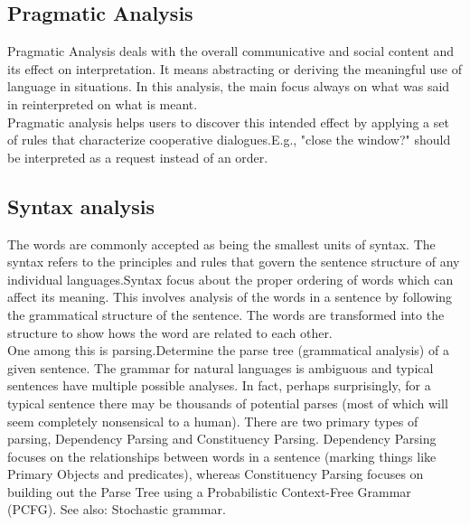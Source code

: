 \subsection{Pragmatic Analysis}
Pragmatic Analysis deals with the overall communicative and social content and its effect on interpretation. It means abstracting or deriving the meaningful use of language in situations. In this analysis, the main focus always on what was said in reinterpreted on what is meant.\\Pragmatic analysis helps users to discover this intended effect by applying a set of rules that characterize cooperative dialogues.E.g., "close the window?" should be interpreted as a request instead of an order.
\subsection{Syntax analysis}
The words are commonly accepted as being the smallest units of syntax. The syntax refers to the principles and rules that govern the sentence structure of any individual languages.Syntax focus about the proper ordering of words which can affect its meaning. This involves analysis of the words in a sentence by following the grammatical structure of the sentence. The words are transformed into the structure to show hows the word are related to each other.\\One among this is parsing.Determine the parse tree (grammatical analysis) of a given sentence. The grammar for natural languages is ambiguous and typical sentences have multiple possible analyses. In fact, perhaps surprisingly, for a typical sentence there may be thousands of potential parses (most of which will seem completely nonsensical to a human). There are two primary types of parsing, Dependency Parsing and Constituency Parsing. Dependency Parsing focuses on the relationships between words in a sentence (marking things like Primary Objects and predicates), whereas Constituency Parsing focuses on building out the Parse Tree using a Probabilistic Context-Free Grammar (PCFG). See also: Stochastic grammar.
